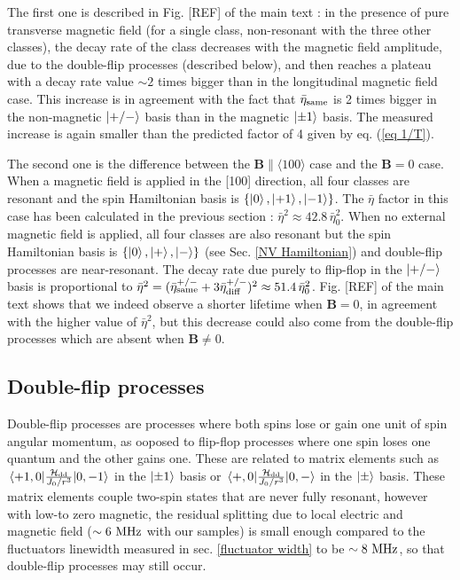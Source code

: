 \documentclass[preprintnumbers,amsmath,amssymb,onecolumn,12pt]{revtex4-2}\usepackage{graphicx}%
\begin{document}
The first one is described in Fig. [REF] of the main text : in the presence of pure transverse magnetic field (for a single class, non-resonant with the three other classes), the decay rate of the class decreases with the magnetic field amplitude, due to the double-flip processes (described below), and then reaches a plateau with a decay rate value $\sim 2$ times bigger than in the longitudinal magnetic field case. This increase is in agreement with the fact that $\bar{\eta}_{\rm same}$ is 2 times bigger in the non-magnetic $\ket{+/-}$ basis than in the magnetic $\ket{\pm 1}$ basis. The measured increase is again smaller than the predicted factor of 4 given by eq. (\ref{eq 1/T}).

The second one is the difference between the $\bm{B} \parallel \langle 100 \rangle$ case and the $\bm{B}=0$ case. When a magnetic field is applied in the [100] direction, all four classes are resonant and the spin Hamiltonian basis is $\{ \ket{0},\ket{+1},\ket{-1} \} $. The $\bar \eta$ factor in this case has been calculated in the previous section : $\bar \eta^2\approx 42.8\, \bar \eta_0^2$. When no external magnetic field is applied, all four classes are also resonant but the spin Hamiltonian basis is  $\{ \ket{0},\ket{+},\ket{-} \} $ (see Sec. \ref{NV Hamiltonian}) and double-flip processes are near-resonant. The decay rate due purely to flip-flop in the $\ket{+/-}$ basis is proportional to $\bar \eta^2 = (\bar{\eta}_{\rm same}^{+/-} + 3\bar{\eta}_{\rm diff}^{+/-})^2 \approx 51.4\, \bar \eta_0^2$. Fig. [REF] of the main text shows that we indeed observe a shorter lifetime when $\bm B=0$, in agreement with the higher value of $\bar \eta^2$, but this decrease could also come from the double-flip processes which are absent when $\bm B \neq 0$.

\subsection{Double-flip processes}

Double-flip processes are processes where both spins lose or gain one unit of spin angular momentum, as ooposed to flip-flop processes where one spin loses one quantum and the other gains one. These are related to matrix elements  such as $\mel{+1,0}{\frac{\mathcal{H}_{\rm dd}}{J_0/r^3}}{0,-1}$ in the $\ket{\pm 1}$ basis or $\mel{+,0}{\frac{\mathcal{H}_{\rm dd}}{J_0/r^3}}{0,-}$ in the $\ket{\pm}$ basis. These matrix elements couple two-spin states that are never fully resonant, however with low-to zero magnetic, the residual splitting due to local electric and magnetic field ($\sim 6\ \rm MHz$ with our samples) is small enough compared to the fluctuators linewidth  measured in sec. \ref{fluctuator width} to be $\sim 8\ \rm MHz$, so that double-flip processes may still occur.
\end{document}
